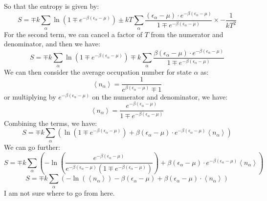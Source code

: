\documentclass[12pt]{article}
\begin{document}
So that the entropy is given by:
\begin{equation}
  S = \mp k \sum_{\alpha} \ln \left(1\mp e^{-\beta\left(\epsilon_{\alpha}-\mu\right)}\right) \pm kT\sum_{\alpha} \frac{(\epsilon_{\alpha} - \mu) \cdot e^{-\beta(\epsilon_{\alpha} - \mu)}}{1 \mp e^{-\beta(\epsilon_{\alpha} - \mu)}} \times -\frac{1}{kT^2}
\end{equation}
For the second term, we can cancel a factor of $T$ from the numerator and denominator, and then we have:
\begin{equation}
  S = \mp k \sum_{\alpha} \ln \left(1\mp e^{-\beta\left(\epsilon_{\alpha}-\mu\right)}\right) \mp k\sum_{\alpha} \frac{\beta (\epsilon_{\alpha} - \mu) \cdot e^{-\beta(\epsilon_{\alpha} - \mu)}}{1 \mp e^{-\beta(\epsilon_{\alpha} - \mu)}}
\end{equation}
We can then consider the average occupation number for state $\alpha$ as:
\begin{equation}
  \left\langle n_{\alpha}\right\rangle = \frac{1}{e^{\beta\left(\epsilon_{\alpha}-\mu\right)}\mp 1}
\end{equation}
or multiplying by $e^{-\beta\left(\epsilon_{\alpha}-\mu\right)}$ on the numerator and denominator, we have:
\begin{equation}
  \left\langle n_{\alpha}\right\rangle = \frac{e^{-\beta\left(\epsilon_{\alpha}-\mu\right)}}{1\mp e^{-\beta\left(\epsilon_{\alpha}-\mu\right)}}
\end{equation}
Combining the terms, we have:
\begin{equation}
  S = \mp k \sum_{\alpha} \left( \ln \left(1\mp e^{-\beta\left(\epsilon_{\alpha}-\mu\right)}\right) + \beta (\epsilon_{\alpha} - \mu) \cdot e^{-\beta(\epsilon_{\alpha} - \mu)}\left\langle n_{\alpha}\right\rangle\right)
\end{equation}
We can go further:
\begin{equation}
  S = \mp k \sum_{\alpha} \left(- \ln \left(\frac{e^{-\beta\left(\epsilon_{\alpha}-\mu\right)}}{e^{-\beta\left(\epsilon_{\alpha}-\mu\right)}(1\mp e^{-\beta\left(\epsilon_{\alpha}-\mu\right)})}\right) + \beta (\epsilon_{\alpha} - \mu) \cdot e^{-\beta(\epsilon_{\alpha} - \mu)}\left\langle n_{\alpha}\right\rangle\right)
\end{equation}
\begin{equation}
  S = \mp k \sum_{\alpha} \left(- \ln \left(\left\langle n_{\alpha}\right\rangle\right) - \beta (\epsilon_{\alpha} - \mu) + \beta (\epsilon_{\alpha} - \mu) \cdot \left\langle n_{\alpha}\right\rangle\right)
\end{equation}
I am not sure where to go from here.
\end{document}
